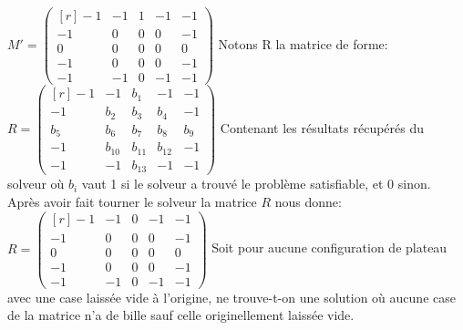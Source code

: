 \documentclass[utf8]{article}
\begin{document}
\hspace{5cm}
$M' = \begin{pmatrix*}[r]
-1 & -1 & 1 & -1 & -1\\
-1 &  0 & 0 & 0 & -1\\
 0 &  0 & 0 & 0 &  0\\
-1 &  0 & 0 & 0 & -1\\
-1 & -1 & 0 & -1 & -1
\end{pmatrix*}$ \newline
Notons R la matrice de forme: \vspace{1cm} \newline
\vspace{0.5cm}
\hspace{5cm}
$R = \begin{pmatrix*}[r]
-1 & -1 & b_1 & -1 & -1\\
-1 &  b_2 & b_3 &  b_4 & -1\\
 b_5 &  b_6 & b_7 &  b_8 &  b_9\\
-1 &  b_{10} & b_{11} &  b_{12} & -1\\
-1 & -1 & b_{13} & -1 & -1
\end{pmatrix*}$
\newline
Contenant les résultats récupérés du solveur où $b_i$ vaut 1 si le solveur a trouvé le problème satisfiable, et 0 sinon. Après avoir fait tourner le solveur la matrice $R$ nous donne: \vspace{1cm} \newline
\vspace{0.5cm}
\hspace{5cm}
$R = \begin{pmatrix*}[r]
-1 & -1 & 0 & -1 & -1\\
-1 &  0 & 0 &  0 & -1\\
 0 &  0 & 0 &  0 &  0\\
-1 &  0 & 0 &  0 & -1\\
-1 & -1 & 0 & -1 & -1
\end{pmatrix*}$
\newline
Soit pour aucune configuration de plateau avec une case laissée vide à l'origine, ne trouve-t-on une solution où aucune case de la matrice n'a de bille sauf celle originellement laissée vide.\newline
\end{document}
